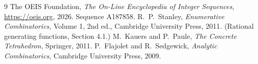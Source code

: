 \documentclass[11pt,a4paper]{article}
\theoremstyle{plain}
\theoremstyle{definition}
\begin{document}
\begin{thebibliography}{9}
 The OEIS Foundation, \emph{The On-Line Encyclopedia of Integer
Sequences}, \url{https://oeis.org}, 2026. Sequence A187858.
 R.~P.~Stanley, \emph{Enumerative Combinatorics}, Volume 1, 2nd ed.,
Cambridge University Press, 2011. (Rational generating functions, Section 4.1.)
 M.~Kauers and P.~Paule, \emph{The Concrete Tetrahedron}, Springer, 2011.
 P.~Flajolet and R.~Sedgewick, \emph{Analytic Combinatorics}, Cambridge
University Press, 2009.
\end{thebibliography}
\end{document}
